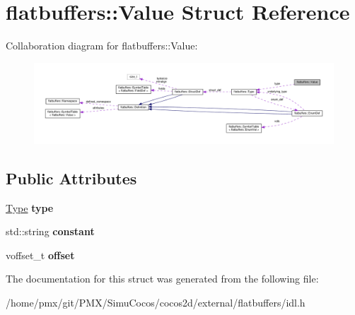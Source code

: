 \hypertarget{structflatbuffers_1_1Value}{}\section{flatbuffers\+:\+:Value Struct Reference}
\label{structflatbuffers_1_1Value}


Collaboration diagram for flatbuffers\+:\+:Value\+:
\nopagebreak
\begin{figure}[H]
\begin{center}
\leavevmode
\includegraphics[width=350pt]{structflatbuffers_1_1Value__coll__graph}
\end{center}
\end{figure}
\subsection*{Public Attributes}
\begin{DoxyCompactItemize}
\item 
\mbox{\label{structflatbuffers_1_1Value_a84349b91966d343ea1c8cf36ab8cc913}} 
\hyperlink{structflatbuffers_1_1Type}{Type} {\bfseries type}
\item 
\mbox{\label{structflatbuffers_1_1Value_a8d84e5c84e74cc0e6a1d5c07794ed5af}} 
std\+::string {\bfseries constant}
\item 
\mbox{\label{structflatbuffers_1_1Value_a498653697e694a562266c4e7098ef00e}} 
voffset\+\_\+t {\bfseries offset}
\end{DoxyCompactItemize}


The documentation for this struct was generated from the following file\+:\begin{DoxyCompactItemize}
\item 
/home/pmx/git/\+P\+M\+X/\+Simu\+Cocos/cocos2d/external/flatbuffers/idl.\+h\end{DoxyCompactItemize}
